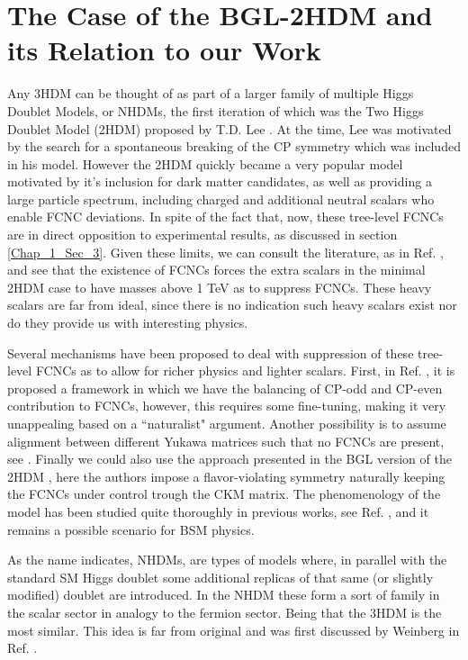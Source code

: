 \documentclass[10pt]{book}
\renewcommand{\(}{\left(}
\renewcommand{\)}{\right)}
\renewcommand{\[}{\left[}
\renewcommand{\]}{\right]}
\begin{document}
\section{The Case of the BGL-2HDM and its Relation to our Work}

Any 3HDM can be thought of as part of a larger family of multiple Higgs Doublet Models, or NHDMs, the first iteration of which was the Two Higgs Doublet Model (2HDM) proposed by T.D. Lee \cite{Lee1973}. At the time, Lee was motivated by the search for a spontaneous breaking of the CP symmetry which was included in his model.  However the 2HDM quickly became a very popular model motivated by it's inclusion for dark matter candidates, as well as providing a large particle spectrum, including charged and additional neutral scalars who enable FCNC deviations. In spite of the fact that, now, these tree-level FCNCs are in direct opposition to experimental results, as discussed in section \ref{Chap_1_Sec_3}. Given these limits, we can consult the literature, as in Ref. \cite{Branco:1999fs}, and see that the existence of FCNCs forces the extra scalars in the minimal 2HDM case to have masses above 1 TeV as to suppress FCNCs. These heavy scalars are far from ideal, since there is no indication such heavy scalars exist nor do they provide us with interesting physics. 

Several mechanisms have been proposed to deal with suppression of these tree-level FCNCs as to allow for richer physics and lighter scalars. First, in Ref. \cite{ferreira2019strong}, it is proposed a framework in which we have the balancing of CP-odd and CP-even contribution to FCNCs, however, this requires some fine-tuning, making it very unappealing based on a ``naturalist" argument. Another possibility is to assume alignment between different Yukawa matrices such that no FCNCs are present, see \cite{Jung_2011}. Finally we could also use the approach presented in the BGL version of the 2HDM \cite{Branco_1996}, here the authors impose a flavor-violating symmetry naturally keeping the FCNCs under control trough the CKM matrix. The phenomenology of the model has been studied quite thoroughly in previous works, see Ref. \cite{Botella_2016}, and it remains a possible scenario for BSM physics.

As the name indicates, NHDMs, are types of models where, in parallel with the standard SM Higgs doublet some additional replicas of that same  (or slightly modified) doublet are introduced. In the NHDM these form a sort of family in the scalar sector in analogy to the fermion sector. Being that the 3HDM is the most similar. This idea is far from original and was first discussed by Weinberg in Ref. \cite{Weinberg1976}.
\end{document}
